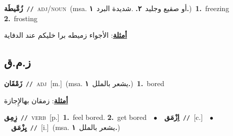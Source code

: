 \documentclass[10pt,a4paper,twoside]{article} %
\begin{document}
\begin{multicols}{2}
{\setlength\topsep{0pt}\textbf{\foreignlanguage{arabic}{زُمَّيطَة}}\ {\color{gray}\texttt{//}\color{black}}\ \textsc{adj/noun}\ \color{gray}(msa. \foreignlanguage{arabic}{أو صقيع وجليد}~\foreignlanguage{arabic}{\textbf{٢.}}  .\foreignlanguage{arabic}{شديدة البرد}~\foreignlanguage{arabic}{\textbf{١.}})\color{black}\ \textbf{1.}~freezing  \textbf{2.}~frosting\  \begin{flushright}\color{gray}\foreignlanguage{arabic}{\textbf{\underline{\foreignlanguage{arabic}{أمثلة}}}: الأجواء زميطه برا خليكم عند الدفاية}\end{flushright}\color{black}} \vspace{2mm}

\vspace{-3mm}
\subsection*{\color{blue}\foreignlanguage{arabic}{ز.م.ق}\color{blue}{}} 

{\setlength\topsep{0pt}\textbf{\foreignlanguage{arabic}{زَمْقَان}}\ {\color{gray}\texttt{//}\color{black}}\ \textsc{adj}\ [m.]\ \color{gray}(msa. \foreignlanguage{arabic}{يشعر بالملل}~\foreignlanguage{arabic}{\textbf{١.}})\color{black}\ \textbf{1.}~bored\  \begin{flushright}\color{gray}\foreignlanguage{arabic}{\textbf{\underline{\foreignlanguage{arabic}{أمثلة}}}: زمقان بهالإِجازة}\end{flushright}\color{black}} \vspace{2mm}

{\setlength\topsep{0pt}\textbf{\foreignlanguage{arabic}{زِمِق}}\ {\color{gray}\texttt{//}\color{black}}\ \textsc{verb}\ [p.]\ \textbf{1.}~feel bored.  \textbf{2.}~get bored\ \ $\bullet$\ \ \setlength\topsep{0pt}\textbf{\foreignlanguage{arabic}{اِزْمَق}}\ {\color{gray}\texttt{//}\color{black}}\ [c.]\ \ $\bullet$\ \ \setlength\topsep{0pt}\textbf{\foreignlanguage{arabic}{يِزْمَق}}\ {\color{gray}\texttt{//}\color{black}}\ [i.]\ \color{gray}(msa. \foreignlanguage{arabic}{يشعر بالملل}~\foreignlanguage{arabic}{\textbf{١.}})\color{black}\ } \vspace{2mm}


\end{multicols}
\end{document}
